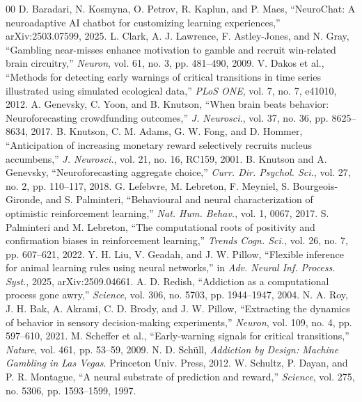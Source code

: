 \documentclass[conference]{IEEEtran}
\begin{document}
\begin{thebibliography}{00}
 D. Baradari, N. Kosmyna, O. Petrov, R. Kaplun, and P. Maes, ``NeuroChat: A
neuroadaptive AI chatbot for customizing learning experiences,'' arXiv:2503.07599, 2025.
 L. Clark, A. J. Lawrence, F. Astley-Jones, and N. Gray, ``Gambling near-misses enhance
motivation to gamble and recruit win-related brain circuitry,'' \textit{Neuron}, vol. 61, no. 3, pp.
481--490, 2009.
 V. Dakos et al., ``Methods for detecting early warnings of critical transitions in
time series illustrated using simulated ecological data,'' \textit{PLoS ONE}, vol. 7, no. 7, e41010,
2012.
 A. Genevsky, C. Yoon, and B. Knutson, ``When brain beats behavior: Neuroforecasting
crowdfunding outcomes,'' \textit{J. Neurosci.}, vol. 37, no. 36, pp. 8625--8634, 2017.
 B. Knutson, C. M. Adams, G. W. Fong, and D. Hommer, ``Anticipation of increasing
monetary reward selectively recruits nucleus accumbens,'' \textit{J. Neurosci.}, vol. 21, no. 16,
RC159, 2001.
 B. Knutson and A. Genevsky, ``Neuroforecasting aggregate choice,''
\textit{Curr. Dir. Psychol. Sci.}, vol. 27, no. 2, pp. 110--117, 2018.
 G. Lefebvre, M. Lebreton, F. Meyniel, S. Bourgeois-Gironde, and S. Palminteri,
``Behavioural and neural characterization of optimistic reinforcement learning,'' \textit{Nat. Hum.
Behav.}, vol. 1, 0067, 2017.
 S. Palminteri and M. Lebreton, ``The computational roots of positivity and
confirmation biases in reinforcement learning,'' \textit{Trends Cogn. Sci.}, vol. 26, no. 7, pp.
607--621, 2022.
 Y. H. Liu, V. Geadah, and J. W. Pillow, ``Flexible inference for animal learning
rules using neural networks,'' in \textit{Adv. Neural Inf. Process. Syst.}, 2025, arXiv:2509.04661.
 A. D. Redish, ``Addiction as a computational process gone awry,'' \textit{Science},
vol. 306, no. 5703, pp. 1944--1947, 2004.
 N. A. Roy, J. H. Bak, A. Akrami, C. D. Brody, and J. W. Pillow, ``Extracting the
dynamics of behavior in sensory decision-making experiments,'' \textit{Neuron}, vol. 109, no. 4, pp.
597--610, 2021.
 M. Scheffer et al., ``Early-warning signals for critical transitions,''
\textit{Nature}, vol. 461, pp. 53--59, 2009.
 N. D. Sch\"ull, \textit{Addiction by Design: Machine Gambling in Las Vegas}.
Princeton Univ. Press, 2012.
 W. Schultz, P. Dayan, and P. R. Montague, ``A neural substrate of prediction and
reward,'' \textit{Science}, vol. 275, no. 5306, pp. 1593--1599, 1997.
\end{thebibliography}
\end{document}
